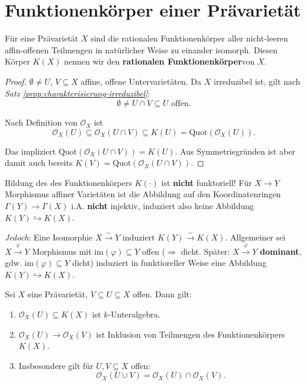 
\section{Funktionenkörper einer Prävarietät}
\label{sec:funktionenkorper-praevarietaet}
\begin{defn}[orig. 43]
  \label{def:funktionenkoerper-praevarietaet}
  Für eine Prävarietät $X$ sind die rationalen Funktionenkörper aller
  nicht-leeren affin-offenen Teilmengen in natürlicher Weise zu einander
  isomorph. Diesen Körper $K(X)$ nennen wir den \textbf{rationalen Funktionenkörper}von $X$.
\end{defn}
\begin{proof}
  $\emptyset\neq U$, $V\subseteq X$ affine, offene Untervarietäten. Da
  $X$ irreduzibel ist, gilt nach \emph{Satz \ref{prop:charakterisierung-irreduzibel}}:
  \[
    \emptyset\neq U\cap V\subseteq U\text{ offen}.
  \]

  Nach Definition von $\mathcal{O}_{X}$ ist 
  \[
    \mathcal{O}_{X}(U)\subseteq\mathcal{O}_{X}(U\cap V)\subseteq K(U)=\text{Quot}(\mathcal{O}_{X}(U)).
  \]

  Das impliziert $\text{Quot}(\mathcal{O}_{X}(U\cap V))=K(U)$. Aus
  Symmetriegründen ist aber damit auch bereits $K(V)=\text{Quot}(\mathcal{O}_{X}(U\cap V))$.
\end{proof}
\begin{rem}[orig. 44]
  \label{rem:funktionenkoerper-nicht-funktoriell}
  Bildung des des Funktionenkörpers $K(\cdot)$ ist \textbf{nicht} funktoriell!
  Für $X\rightarrow Y$ Morphismus affiner Varietäten ist die Abbildung
  auf den Koordinatenringen $\Gamma(Y)\rightarrow\Gamma(X)$ i.A. \textbf{nicht}
  injektiv, induziert also keine Abbildung $K(Y)\hookrightarrow K(X)$.

  \emph{Jedoch}: Eine Isomorphie $X\xrightarrow{\sim}Y$ induziert $K(Y)\xrightarrow{\sim}K(X)$.
  Allgemeiner sei $X\xrightarrow{\varphi} Y$ Morphismus mit $\text{im}(\varphi) \subseteq Y$
  offen ($\Rightarrow$ dicht. Später: $X\xrightarrow{\varphi} Y$ \textbf{dominant},
  gdw. $\text{im}(\varphi)\subseteq Y$ dicht) induziert in funktioreller Weise eine
  Abbildung $K(Y)\hookrightarrow K(X)$.
\end{rem}
\begin{prop}[orig. 45]
  \label{prop:charakterisierung-schnitte-praevarietaet}
  Sei $X$ eine Prävarietät, $V\subseteq U\subseteq X$ offen. Dann gilt:

  \begin{enumerate}
  \item $\mathcal{O}_{X}(U)\subseteq K(X)$ ist $k$-Unteralgebra.

  \item $\mathcal{O}_{X}(U)\rightarrow\mathcal{O}_{X}(V)$ ist Inklusion von Teilmengen des Funktionenkörpers $K(X)$.

  \item Insbesondere gilt für $U,V\subseteq X$ offen:
    \[
      \mathcal{O}_{X}(U\cup V)=\mathcal{O}_{X}(U)\cap\mathcal{O}_{X}(V).
    \]
  \end{enumerate}
\end{prop}
